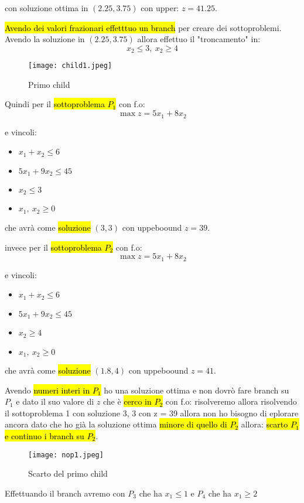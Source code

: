 con soluzione ottima in $(2.25, 3.75)$ con upper: $z = 41.25$.

\hl{Avendo dei valori frazionari effetttuo un branch} per creare dei sottoproblemi. Avendo la soluzione in $(2.25, 3.75)$ allora effettuo il "troncamento" in:
$$x_2 \leq 3,\ x_2 \geq 4$$

\begin{figure}[H]
\centering
\texttt{[image: child1.jpeg]}
\caption{Primo child} 
\label{child1}
\end{figure}

Quindi per il \hl{sottoproblema $P_1$} con f.o:
$$\max z = 5x_1 + 8x_2$$

e vincoli:
\begin{itemize}
    \item $x_1 + x_2 \leq 6$
    \item $5x_1 + 9x_2 \leq 45$
    \item $x_2 \leq 3$
    \item $x_1,\ x_2 \geq 0$
\end{itemize}

che avrà come \hl{soluzione} $(3, 3)$ con uppeboound $z = 39$.

invece per il \hl{sottoproblema $P_2$} con f.o:
$$\max z = 5x_1 + 8x_2$$

e vincoli:
\begin{itemize}
    \item $x_1 + x_2 \leq 6$
    \item $5x_1 + 9x_2 \leq 45$
    \item $x_2 \geq 4$
    \item $x_1,\ x_2 \geq 0$
\end{itemize}

che avrà come \hl{soluzione} $(1.8, 4)$ con uppeboound $z = 41$.

Avendo \hl{numeri interi in $P_1$} ho una soluzione ottima e non dovrò fare branch su $P_1$ e dato il suo valore di $z$ che è \hl{cerco in $P_2$} con f.o:
risolveremo allora risolvendo il sottoproblema 1 con soluzione 3, 3 con z = 39 allora non ho bisogno di eplorare ancora dato che ho già la soluzione ottima \hl{minore di quello di $P_2$} allora: \hl{scarto $P_1$ e continuo i branch su $P_2$}.


\begin{figure}[H]
\centering
\texttt{[image: nop1.jpeg]}
\caption{Scarto del primo child} 
\label{nop1}
\end{figure}


Effettuando il branch avremo con $P_3$ che ha  $x_1 \leq 1$ e $P_4$ che ha $x_1 \geq 2$

